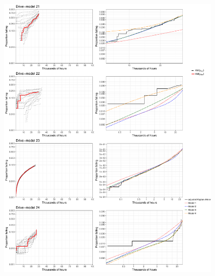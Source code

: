 \documentclass[12pt]{article}
\begin{document}
\begin{figure}[H]
\includegraphics[width=\textwidth]{ppcheck-v3-6.pdf}
\end{figure}
\end{document}
